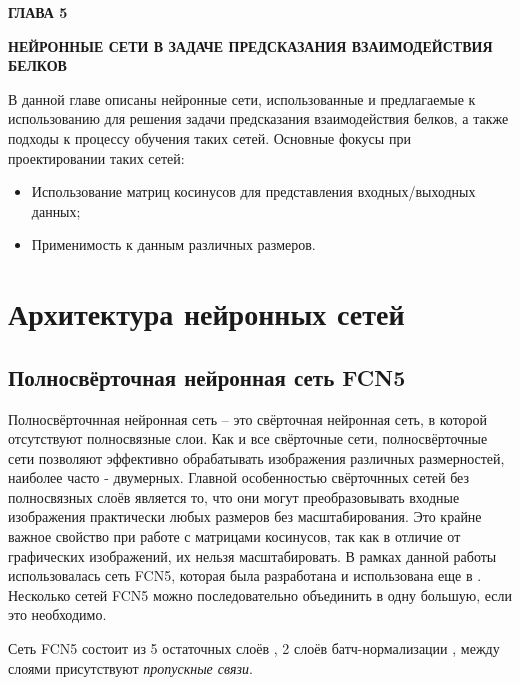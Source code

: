 \newpage
\begin{center}
	\textbf{\large ГЛАВА 5}

	\textbf{\large НЕЙРОННЫЕ СЕТИ В ЗАДАЧЕ ПРЕДСКАЗАНИЯ ВЗАИМОДЕЙСТВИЯ БЕЛКОВ}
\end{center}

В данной главе описаны нейронные сети, использованные и предлагаемые к использованию для решения задачи предсказания взаимодействия белков, а также подходы к процессу обучения таких сетей. Основные фокусы при проектировании таких сетей:
\begin{itemize}
\item Использование матриц косинусов для представления входных/выходных данных;
\item Применимость к данным различных размеров.
\end{itemize}

\section{Архитектура нейронных сетей}

\subsection{Полносвёрточная нейронная сеть FCN5}
Полносвёрточнная нейронная сеть\cite{fully_conv} -- это свёрточная нейронная сеть, в которой отсутствуют полносвязные слои. Как и все свёрточные сети, полносвёрточные сети позволяют эффективно обрабатывать изображения различных размерностей, наиболее часто - двумерных. Главной особенностью свёрточнных сетей без полносвязных слоёв является то, что они могут преобразовывать входные изображения практически любых размеров без масштабирования. Это крайне важное свойство при работе с матрицами косинусов, так как в отличие от графических изображений, их нельзя масштабировать. В рамках данной работы использовалась сеть FCN5, которая была разработана и использована еще в \cite{prip2023}. Несколько сетей FCN5 можно последовательно объединить в одну большую, если это необходимо.

Сеть FCN5 состоит из 5 остаточных слоёв \cite{resnet}, 2 слоёв батч-нормализации \cite{batchnorm}, между слоями присутствуют \textit{пропускные связи}.

